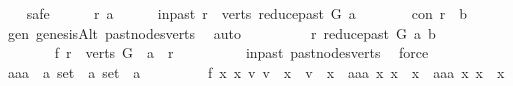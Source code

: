 \begin{isabellebody}
\ \ \isamarkupfalse%
\ safe\isanewline
\ \ \ \ \isamarkupfalse%
\ r\ a\isanewline
\ \ \ \ \isamarkupfalse%
\ in{\isacharunderscore}{\kern0pt}past{\isacharcolon}{\kern0pt}\ {\isachardoublequoteopen}r\ {\isasymin}\ verts\ {\isacharparenleft}{\kern0pt}reduce{\isacharunderscore}{\kern0pt}past\ G\ a{\isacharparenright}{\kern0pt}{\isachardoublequoteclose}\isanewline
\ \ \ \ \isamarkupfalse%
\ \isamarkupfalse%
\ con{\isacharcolon}{\kern0pt}\ {\isachardoublequoteopen}r\ {\isasymrightarrow}\isactrlsup {\isacharasterisk}{\kern0pt}\ b{\isachardoublequoteclose}\ \isamarkupfalse%
\ gen\ genesisAlt\ past{\isacharunderscore}{\kern0pt}nodes{\isacharunderscore}{\kern0pt}verts\ \isamarkupfalse%
\ auto\ \ \isanewline
\ \ \ \ \isamarkupfalse%
\ \isamarkupfalse%
\ {\isachardoublequoteopen}r\ {\isasymrightarrow}\isactrlsup {\isacharasterisk}{\kern0pt}\isactrlbsub reduce{\isacharunderscore}{\kern0pt}past\ G\ a\isactrlesub \ b{\isachardoublequoteclose}\isanewline
\ \ \ \ \isamarkupfalse%
\ {\isacharminus}{\kern0pt}\isanewline
\ \ \ \ \ \ \isamarkupfalse%
\ f{}{\isacharcolon}{\kern0pt}\ {\isachardoublequoteopen}r\ {\isasymin}\ verts\ G\ {\isasymand}\ a\ {\isasymrightarrow}\isactrlsup {\isacharplus}{\kern0pt}\ r{\isachardoublequoteclose}\isanewline
\ \ \ \ \ \ \ \ \isamarkupfalse%
\ in{\isacharunderscore}{\kern0pt}past\ past{\isacharunderscore}{\kern0pt}nodes{\isacharunderscore}{\kern0pt}verts\ \isamarkupfalse%
\ force\isanewline
\ \ \ \ \ \ \isamarkupfalse%
\ aaa\ {\isacharcolon}{\kern0pt}{\isacharcolon}{\kern0pt}\ {\isachardoublequoteopen}{\isacharprime}{\kern0pt}a\ set\ {\isasymRightarrow}\ {\isacharprime}{\kern0pt}a\ set\ {\isasymRightarrow}\ {\isacharprime}{\kern0pt}a{\isachardoublequoteclose}\ \isanewline
\ \ \ \ \ \ \ \ f{}{\isacharcolon}{\kern0pt}\ {\isachardoublequoteopen}{\isasymforall}x{}\ x{}{\isachardot}{\kern0pt}\ {\isacharparenleft}{\kern0pt}{\isasymexists}v{}{\isachardot}{\kern0pt}\ v{}\ {\isasymin}\ x{}\ {\isasymand}\ v{}\ {\isasymnotin}\ x{}{\isacharparenright}{\kern0pt}\ {\isacharequal}{\kern0pt}\ {\isacharparenleft}{\kern0pt}aaa\ x{}\ x{}\ {\isasymin}\ x{}\ {\isasymand}\ aaa\ x{}\ x{}\ {\isasymnotin}\ x{}{\isacharparenright}{\kern0pt}{\isachardoublequoteclose}\isanewline

\end{isabellebody}

